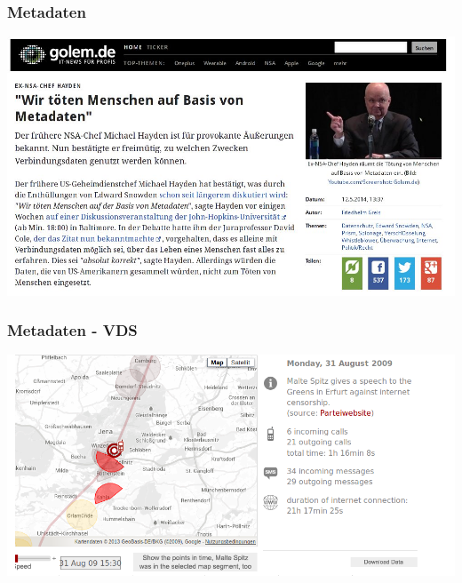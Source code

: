 \documentclass[12pt]{beamer}
\begin{document}
\begin{frame}
    \frametitle{Metadaten}
    \begin{center}
      \includegraphics[height=0.7\textheight]{img/wekillpeople.jpg}
    \end{center}
\end{frame}

\begin{frame}
    \frametitle{Metadaten - VDS}
    \includegraphics[height=0.7\textheight]{img/maltespitz.png}
\end{frame}

\end{document}
